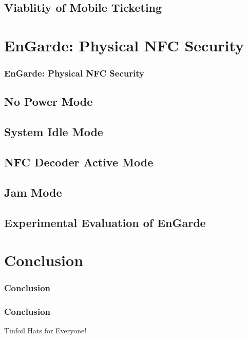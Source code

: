 \documentclass[unknownkeysallowed]{beamer}
\begin{document}
\subsection{Viablitiy of Mobile Ticketing}


\section{EnGarde: Physical NFC Security}
\begin{frame}
\frametitle{EnGarde: Physical NFC Security}
\begin{center}\begin{minipage}{.9\textwidth}
\tableofcontents[currentsubsection, hideothersubsections, sectionstyle=show/shaded]
\end{minipage}\end{center}
\end{frame}
%

\subsection{No Power Mode}
\subsection{System Idle Mode}
\subsection{NFC Decoder Active Mode}
\subsection{Jam Mode}
\subsection{Experimental Evaluation of EnGarde}


\section{Conclusion}
\begin{frame}
\frametitle{Conclusion}
\begin{center}\begin{minipage}{.9\textwidth}
\tableofcontents[currentsubsection, hideothersubsections, sectionstyle=show/shaded]
\end{minipage}\end{center}
\end{frame}
%
\begin{frame}
  \frametitle{Conclusion}
  \begin{block}{Tinfoil Hats for Everyone!}
  \end{block}
\end{frame}
\end{document}
